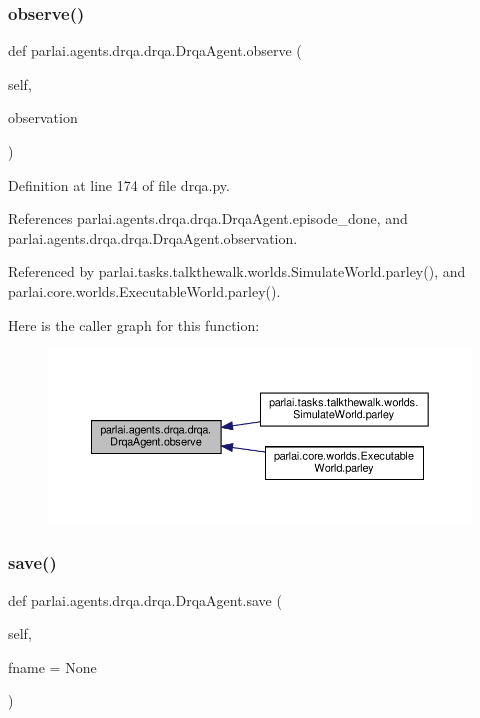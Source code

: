 \subsubsection{\texorpdfstring{observe()}{observe()}}
{\footnotesize\ttfamily def parlai.\+agents.\+drqa.\+drqa.\+Drqa\+Agent.\+observe (\begin{DoxyParamCaption}\item[{}]{self,  }\item[{}]{observation }\end{DoxyParamCaption})}



Definition at line 174 of file drqa.\+py.



References parlai.\+agents.\+drqa.\+drqa.\+Drqa\+Agent.\+episode\+\_\+done, and parlai.\+agents.\+drqa.\+drqa.\+Drqa\+Agent.\+observation.



Referenced by parlai.\+tasks.\+talkthewalk.\+worlds.\+Simulate\+World.\+parley(), and parlai.\+core.\+worlds.\+Executable\+World.\+parley().

Here is the caller graph for this function\+:
\nopagebreak
\begin{figure}[H]
\begin{center}
\leavevmode
\includegraphics[width=350pt]{classparlai_1_1agents_1_1drqa_1_1drqa_1_1DrqaAgent_a17be110f5f7cba058238fae60a420507_icgraph}
\end{center}
\end{figure}
\mbox{\label{classparlai_1_1agents_1_1drqa_1_1drqa_1_1DrqaAgent_a654906588f91d21110921ad2ba498c95}} 
\subsubsection{\texorpdfstring{save()}{save()}}
{\footnotesize\ttfamily def parlai.\+agents.\+drqa.\+drqa.\+Drqa\+Agent.\+save (\begin{DoxyParamCaption}\item[{}]{self,  }\item[{}]{fname = {\ttfamily None} }\end{DoxyParamCaption})}

